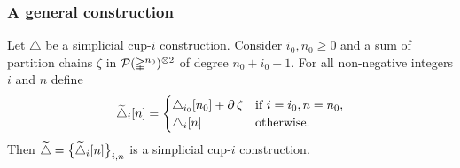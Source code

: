 
\subsubsection{A general construction}

\begin{lemma}
	Let $\triangle$ be a simplicial \mbox{cup-$i$} construction.
	Consider $i_0, n_0 \geq 0$ and a sum of partition chains $\zeta$ in $\cP(\simplex^{n_0})^{\ot 2}$ of degree $n_0+i_0+1$.
	For all non-negative integers $i$ and $n$ define
	\[
	\widetilde\triangle_i[n] =
	\begin{cases}
		\triangle_{i_0}[n_0] + \bd\zeta & \text{if } i=i_0, n=n_0, \\
		\triangle_{i}[n] & \text{otherwise}.
	\end{cases}
	\]
	Then $\widetilde\triangle = \set[\big]{\widetilde\triangle_i[n]}_{i,n}$ is a simplicial \mbox{cup-$i$} construction.
\end{lemma}

